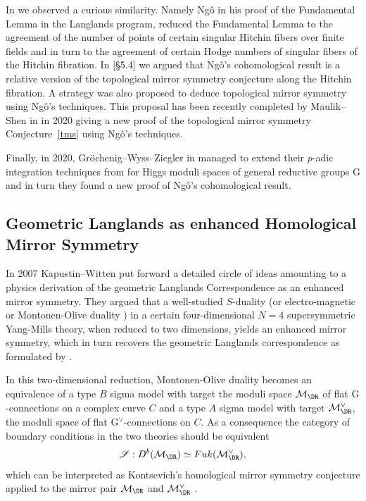 \documentclass[12pt]{article}
\numberwithin{equation}{section}
\theoremstyle{remark}
\numberwithin{theorem}{section}
\def\beq{\begin{eqnarray}}
\def\eeq{\end{eqnarray}}
\def\M{{\mathcal{M}}}
\newcommand{\G}{\mathrm{G}}
\numberwithin{equation}{section}
\begin{document}
In \cite{hausel-gths} we observed a curious similarity. Namely Ng\^{o} in his proof \cite{ngo} of the Fundamental Lemma in the  Langlands program, reduced the Fundamental Lemma to the agreement of the number of points of certain singular Hitchin fibers over finite fields and in turn to the agreement of certain Hodge numbers of singular fibers of the Hitchin fibration. In \cite{hausel-gths}[\S 5.4] we argued that Ng\^{o}'s cohomological result is a relative version of the topological mirror symmetry conjecture  along the Hitchin fibration. A strategy was also proposed to deduce topological mirror symmetry using Ng\^{o}'s techniques. This proposal has been recently completed by Maulik--Shen in \cite{maulik-shen} in 2020 giving a new proof of the topological mirror symmetry Conjecture~\ref{tms} using Ng\^{o}'s techniques. 

Finally, in 2020,  Gr\"ochenig--Wyss--Ziegler in \cite{groechenig-etal2}  managed to extend their $p$-adic integration techniques from \cite{groechenig-etal1} for Higgs moduli spaces of general reductive groups $\G$ and in turn they found a new proof of Ng\^{o}'s cohomological result. 

\subsection{Geometric Langlands as enhanced Homological Mirror Symmetry} \label{gls}

In 2007 Kapustin--Witten \cite{kapustin-witten}  put forward a detailed circle of ideas amounting to  a physics derivation  of the geometric Langlands Correspondence as an enhanced mirror symmetry. They argued that a well-studied $S$-duality (or electro-magnetic or Montonen-Olive duality \cite{montonen-olive}) in a certain four-dimensional $N=4$ supersymmetric Yang-Mills theory, when reduced to two dimensions, yields an enhanced mirror symmetry, which in turn recovers the geometric Langlands correspondence as formulated by \cite{beilinson-drinfeld}. 

In this two-dimensional reduction, Montonen-Olive duality becomes an equivalence of a type $B$ sigma model with target the moduli space $\M_\DR$  of flat $\G$-connections on a complex curve $C$  and a type $A$ sigma model with target $\M^\vee_\DR$, the moduli space of flat $\G^\vee$-connections on $C$. As a consequence the category of boundary conditions in the two theories should be equivalent \beq \label{hmsgl} \mathscr{S}:D^b(\M_\DR)\simeq Fuk(\M_\DR^\vee),\eeq which can be interpreted as Kontsevich's homological mirror symmetry conjecture applied to the mirror pair $\M_\DR$ and $\M_\DR^\vee$ . 
\end{document}

